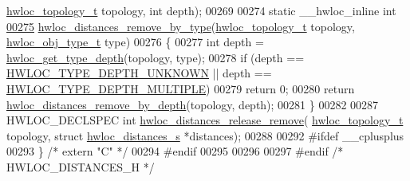 \begin{DoxyCode}
      \hyperlink{a00186_ga9d1e76ee15a7dee158b786c30b6a6e38}{hwloc\_topology\_t} topology, \textcolor{keywordtype}{int} depth);
00269 
00274 \textcolor{keyword}{static} \_\_hwloc\_inline \textcolor{keywordtype}{int}
\hyperlink{a00210_ga93db53773c96f5b83815e8441e2ebb93}{00275} \hyperlink{a00210_ga93db53773c96f5b83815e8441e2ebb93}{hwloc\_distances\_remove\_by\_type}(\hyperlink{a00186_ga9d1e76ee15a7dee158b786c30b6a6e38}{hwloc\_topology\_t} topology, 
      \hyperlink{a00184_gacd37bb612667dc437d66bfb175a8dc55}{hwloc\_obj\_type\_t} type)
00276 \{
00277   \textcolor{keywordtype}{int} depth = \hyperlink{a00187_ga8bec782e21be313750da70cf7428b374}{hwloc\_get\_type\_depth}(topology, type);
00278   \textcolor{keywordflow}{if} (depth == \hyperlink{a00187_ggaf4e663cf42bbe20756b849c6293ef575a0565ab92ab72cb0cec91e23003294aad}{HWLOC\_TYPE\_DEPTH\_UNKNOWN} || depth == 
      \hyperlink{a00187_ggaf4e663cf42bbe20756b849c6293ef575ae99465995cacde6c210d5fc2e409798c}{HWLOC\_TYPE\_DEPTH\_MULTIPLE})
00279     \textcolor{keywordflow}{return} 0;
00280   \textcolor{keywordflow}{return} \hyperlink{a00210_gaa642a4c1a21c84f38ae23fca8a27845d}{hwloc\_distances\_remove\_by\_depth}(topology, depth);
00281 \}
00282 
00287 HWLOC\_DECLSPEC \textcolor{keywordtype}{int} \hyperlink{a00210_ga80bbf6f0db9af48c61780dd5152664c2}{hwloc\_distances\_release\_remove}(
      \hyperlink{a00186_ga9d1e76ee15a7dee158b786c30b6a6e38}{hwloc\_topology\_t} topology, \textcolor{keyword}{struct} \hyperlink{a00310}{hwloc\_distances\_s} *distances);
00288 
00292 \textcolor{preprocessor}{#ifdef \_\_cplusplus}
00293 \} \textcolor{comment}{/* extern "C" */}
00294 \textcolor{preprocessor}{#endif}
00295 
00296 
00297 \textcolor{preprocessor}{#endif }\textcolor{comment}{/* HWLOC\_DISTANCES\_H */}\textcolor{preprocessor}{}
\end{DoxyCode}
